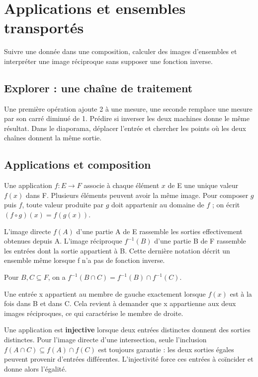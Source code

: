 \clearpage
\section{Applications et ensembles transportés}
\begin{objectif}
Suivre une donnée dans une composition, calculer des images d'ensembles et interpréter une image réciproque sans supposer une fonction inverse.
\end{objectif}
\subsection{Explorer : une chaîne de traitement}
Une première opération ajoute 2 à une mesure, une seconde remplace une mesure par son carré diminué de 1. Prédire si inverser les deux machines donne le même résultat. Dans le diaporama, déplacer l'entrée et chercher les points où les deux chaînes donnent la même sortie.
\subsection{Applications et composition}
\begin{definition}[application]
Une application $f:E\to F$ associe à chaque élément $x$ de E une unique valeur $f(x)$ dans F. Plusieurs éléments peuvent avoir la même image. Pour composer $g$ puis $f$, toute valeur produite par $g$ doit appartenir au domaine de $f$ ; on écrit $(f\circ g)(x)=f(g(x))$.
\end{definition}
\begin{definition}
L'image directe $f(A)$ d'une partie A de E rassemble les sorties effectivement obtenues depuis A. L'image réciproque $f^{-1}(B)$ d'une partie B de F rassemble les entrées dont la sortie appartient à B. Cette dernière notation décrit un ensemble même lorsque f n'a pas de fonction inverse.
\end{definition}
\begin{propriete}
Pour $B,C\subseteq F$, on a $f^{-1}(B\cap C)=f^{-1}(B)\cap f^{-1}(C)$.
\end{propriete}
\begin{demonstration}
Une entrée x appartient au membre de gauche exactement lorsque $f(x)$ est à la fois dans B et dans C. Cela revient à demander que x appartienne aux deux images réciproques, ce qui caractérise le membre de droite.
\end{demonstration}
Une application est \textbf{injective} lorsque deux entrées distinctes donnent des sorties distinctes. Pour l'image directe d'une intersection, seule l'inclusion $f(A\cap C)\subseteq f(A)\cap f(C)$ est toujours garantie : les deux sorties égales peuvent provenir d'entrées différentes. L'injectivité force ces entrées à coïncider et donne alors l'égalité.
